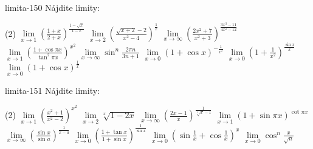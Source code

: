 \begin{defproblem}{limita-150}
Nájdite limity:
\begin{tasks}(2)
    \task $\lim\limits_{{x \rightarrow 1}} (\frac{1+x}{2+x})^{\frac{1-\sqrt{x}}{1-x}}$
    \task $\lim\limits_{{x \rightarrow 2}} (\frac{\sqrt{x+2}-2}{x^2-4})^{\frac{1}{x}}$
    \task $\lim\limits_{{x \rightarrow \infty}} (\frac{2x^2+7}{x^2+3})^{\frac{3x^3-11}{4x^2-12}}$
    \task $\lim\limits_{{x \rightarrow 1}} (\frac{1+\cos \pi x}{\tan ^2 \pi x})^{x^2}$
    \task $\lim\limits_{{x \rightarrow \infty}} \sin ^n \frac{2 \pi n}{3n+1}$
    \task $\lim\limits_{{x \rightarrow 0}} (1+\cos x)^{-\frac{1}{x^2}}$
    \task $\lim\limits_{{x \rightarrow 0}} (1+\frac{1}{x^2})^{\frac{\sin x}{x}}$
    \task $\lim\limits_{{x \rightarrow 0}} (1+\cos x)^{\frac{1}{x}}$
\end{tasks}
\end{defproblem}

\begin{defproblem}{limita-151}
Nájdite limity:
\begin{tasks}(2)
    \task $\lim\limits_{{x \rightarrow 1}} (\frac{x^2+1}{x^2-2})^{x^2}$
    \task $\lim\limits_{{x \rightarrow 2}} \sqrt[x]{1-2x}$
    \task $\lim\limits_{{x \rightarrow \infty}} (\frac{2x-1}{x})^{\frac{1}{\sqrt[3]{x}-1}}$
    \task $\lim\limits_{{x \rightarrow 1}} (1+\sin \pi x)^{\cot \pi x}$
    \task $\lim\limits_{{x \rightarrow \infty}} (\frac{\sin x}{\sin a})^{\frac{1}{x-a}}$
    \task $\lim\limits_{{x \rightarrow 0}} (\frac{1+\tan x}{1+\sin x})^{\frac{1}{\sin x}}$
    \task $\lim\limits_{{x \rightarrow 0}} (\sin \frac{1}{x}+\cos \frac{1}{x})^x$
    \task $\lim\limits_{{x \rightarrow 0}} \cos ^n \frac{x}{\sqrt{n}}$
\end{tasks}
\end{defproblem}

